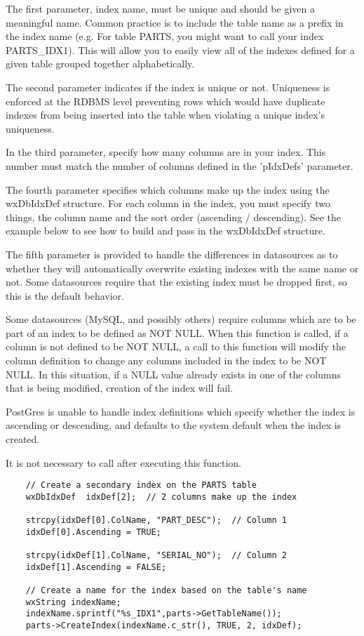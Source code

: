The first parameter, index name, must be unique and should be given a 
meaningful name.  Common practice is to include the table name as a prefix 
in the index name (e.g. For table PARTS, you might want to call your index 
PARTS_IDX1).  This will allow you to easily view all 
of the indexes defined for a given table grouped together alphabetically.

The second parameter indicates if the index is unique or not.  Uniqueness 
is enforced at the RDBMS level preventing rows which would have duplicate
indexes from being inserted into the table when violating a unique index's 
uniqueness.

In the third parameter, specify how many columns are in your index.  This 
number must match the number of columns defined in the 'pIdxDefs' parameter.

The fourth parameter specifies which columns make up the index using the 
wxDbIdxDef structure.  For each column in the index, you must specify two 
things, the column name and the sort order (ascending / descending).  See 
the example below to see how to build and pass in the wxDbIdxDef structure.

The fifth parameter is provided to handle the differences in datasources as 
to whether they will automatically overwrite existing indexes with the same 
name or not.  Some datasources require that the existing index must be dropped 
first, so this is the default behavior.

Some datasources (MySQL, and possibly others) require columns which are to be 
part of an index to be defined as NOT NULL.  When this function is called, if 
a column is not defined to be NOT NULL, a call to this function will modify 
the column definition to change any columns included in the index to be 
NOT NULL.  In this situation, if a NULL value already exists in one of the 
columns that is being modified, creation of the index will fail.

PostGres is unable to handle index definitions which specify whether the index 
is ascending or descending, and defaults to the system default when the index 
is created.

It is not necessary to call  
after executing this function.


\begin{verbatim}
    // Create a secondary index on the PARTS table
    wxDbIdxDef  idxDef[2];  // 2 columns make up the index

    strcpy(idxDef[0].ColName, "PART_DESC");  // Column 1
    idxDef[0].Ascending = TRUE;

    strcpy(idxDef[1].ColName, "SERIAL_NO");  // Column 2
    idxDef[1].Ascending = FALSE;

    // Create a name for the index based on the table's name
    wxString indexName;
    indexName.sprintf("%s_IDX1",parts->GetTableName());
    parts->CreateIndex(indexName.c_str(), TRUE, 2, idxDef);
\end{verbatim}


